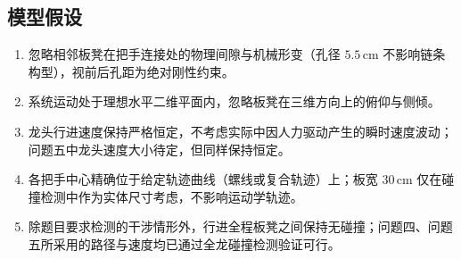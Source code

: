 ﻿\documentclass{cumcmthesis}
\begin{document}
\subsection{模型假设}
\begin{enumerate}[label=(\arabic*), itemsep=0.3em]
    \item 忽略相邻板凳在把手连接处的物理间隙与机械形变（孔径 $5.5\,\text{cm}$ 不影响链条构型），视前后孔距为绝对刚性约束。
    \item 系统运动处于理想水平二维平面内，忽略板凳在三维方向上的俯仰与侧倾。
    \item 龙头行进速度保持严格恒定，不考虑实际中因人力驱动产生的瞬时速度波动；问题五中龙头速度大小待定，但同样保持恒定。
    \item 各把手中心精确位于给定轨迹曲线（螺线或复合轨迹）上；板宽 $30\,\text{cm}$ 仅在碰撞检测中作为实体尺寸考虑，不影响运动学轨迹。
    \item 除题目要求检测的干涉情形外，行进全程板凳之间保持无碰撞；问题四、问题五所采用的路径与速度均已通过全龙碰撞检测验证可行。
\end{enumerate}
\end{document}
